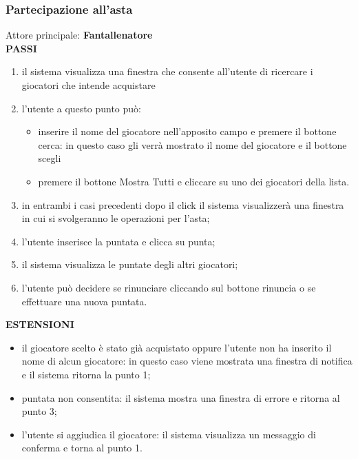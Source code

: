\documentclass[12pt,a4paper]{article}
\begin{document}
\subsubsection*{Partecipazione all'asta}
Attore principale: \textbf{Fantallenatore}\\
\newline
\textbf{PASSI}
\begin{enumerate}
\item il sistema visualizza una finestra che consente all'utente di ricercare i giocatori che intende acquistare
\item l'utente  a questo punto può:
\begin{itemize}
\item inserire il nome del giocatore nell'apposito campo e premere il bottone cerca: in questo caso gli verrà mostrato il nome del giocatore e il bottone scegli
\item premere il bottone Mostra Tutti e cliccare su uno dei giocatori della lista.
\end{itemize}
\item in entrambi i casi precedenti dopo il click il sistema visualizzerà una finestra in cui si svolgeranno le operazioni per l'asta;
\item l'utente inserisce la puntata e clicca su punta;
\item il sistema visualizza le puntate degli altri giocatori;
\item l'utente può decidere se rinunciare cliccando sul bottone rinuncia o se effettuare una nuova puntata.
\end{enumerate}
\textbf{ESTENSIONI}
\begin{itemize}
\item il giocatore scelto è stato già acquistato oppure l'utente non ha inserito il nome di alcun giocatore: in questo caso viene mostrata una finestra di notifica e il sistema ritorna la punto 1;
\item puntata non consentita: il sistema mostra una finestra di errore e ritorna al punto 3;
\item l'utente si aggiudica il giocatore: il sistema visualizza un messaggio di conferma e torna al punto 1.
\end{itemize}
\end{document}
